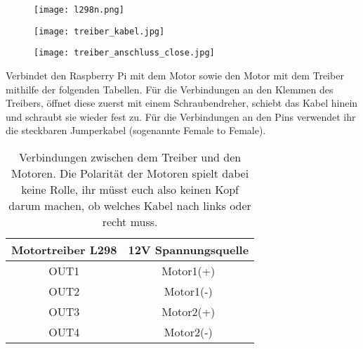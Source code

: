 \begin{figure}[h]
\centering
\texttt{[image: l298n.png]}
\end{figure}

\begin{figure}[h]
\centering
\texttt{[image: treiber\_kabel.jpg]}
\end{figure}

\begin{figure}[h]
\centering
\texttt{[image: treiber\_anschluss\_close.jpg]}
\end{figure}


Verbindet den Raspberry Pi mit dem Motor sowie den Motor mit dem Treiber mithilfe der folgenden Tabellen.
Für die Verbindungen an den Klemmen des Treibers, öffnet diese zuerst mit einem Schraubendreher, schiebt das Kabel hinein und schraubt sie wieder fest zu. Für die Verbindungen an den Pins verwendet ihr die steckbaren Jumperkabel (sogenannte Female to Female).\\

\begin{table}[h]
  \begin{center}
\begin{tabular}{@{}cc@{}}
\toprule
Motortreiber L298 & 12V Spannungsquelle \\ \midrule
OUT1              & Motor1(+)           \\
OUT2              & Motor1(-)           \\
OUT3              & Motor2(+)           \\
OUT4              & Motor2(-)           \\ \bottomrule
\end{tabular}
\end{center}
\caption{Verbindungen zwischen dem Treiber und den Motoren. Die Polarität der Motoren spielt dabei keine Rolle, ihr müsst euch also keinen Kopf darum machen, ob welches Kabel nach links oder recht muss.}
\end{table}



